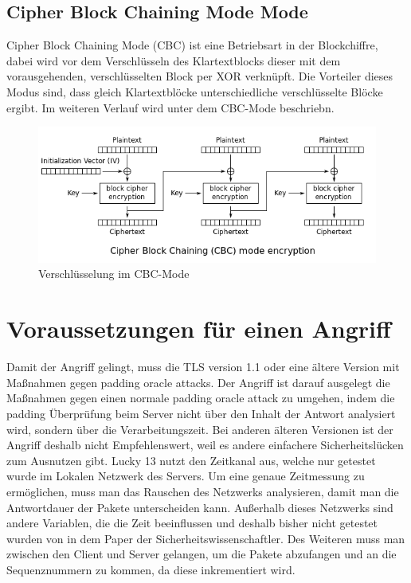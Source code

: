 \documentclass[a4paper,10pt]{scrartcl}
\begin{document}
    \subsection{Cipher Block Chaining Mode Mode}\label{subsec:cbc-mode}
    Cipher Block Chaining Mode (CBC) ist eine Betriebsart in der Blockchiffre, dabei wird vor dem Verschlüsseln des Klartextblocks dieser mit dem vorausgehenden, verschlüsselten Block per XOR verknüpft.
    Die Vorteiler dieses Modus sind, dass gleich Klartextblöcke unterschiedliche verschlüsselte Blöcke ergibt.
    Im weiteren Verlauf wird unter dem CBC-Mode beschriebn.
    \begin{figure}[h]
        \begin{center}
            \includegraphics[width=12cm]{./Literatur/documents/wo8Bl}\newline\caption{Verschlüsselung im CBC-Mode}
            \label{CBC_Mode}
        \end{center}
    \end{figure}


    \section{Voraussetzungen für einen Angriff}\label{sec:voraussetzungen-fur-einen-angriff}
    Damit der Angriff gelingt, muss die TLS version 1.1 oder eine ältere Version mit Maßnahmen gegen padding oracle attacks.
    Der Angriff ist darauf ausgelegt die Maßnahmen gegen einen normale padding oracle attack zu umgehen, indem die padding Überprüfung beim Server nicht über den Inhalt der Antwort analysiert wird, sondern über die Verarbeitungszeit.
    Bei anderen älteren Versionen ist der Angriff deshalb nicht Empfehlenswert, weil es andere einfachere Sicherheitslücken zum Ausnutzen gibt.
    \newline
    Lucky 13 nutzt den Zeitkanal aus, welche nur getestet wurde im Lokalen Netzwerk des Servers.
    Um eine genaue Zeitmessung zu ermöglichen, muss man das Rauschen des Netzwerks analysieren, damit man die Antwortdauer der Pakete unterscheiden kann.
    Außerhalb dieses Netzwerks sind andere Variablen, die die Zeit beeinflussen und deshalb bisher nicht getestet wurden von in dem Paper der Sicherheitswissenschaftler\cite[S. 11]{AlFardan2013}.
    Des Weiteren muss man zwischen den Client und Server gelangen, um die Pakete abzufangen und an die Sequenznummern zu kommen, da diese inkrementiert wird.
\end{document}
